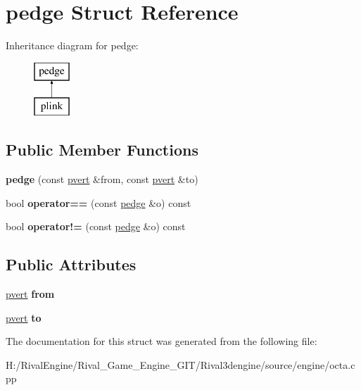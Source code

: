 \hypertarget{structpedge}{}\section{pedge Struct Reference}
\label{structpedge}
Inheritance diagram for pedge\+:\begin{figure}[H]
\begin{center}
\leavevmode
\includegraphics[height=2.000000cm]{structpedge}
\end{center}
\end{figure}
\subsection*{Public Member Functions}
\begin{DoxyCompactItemize}
\item 
\mbox{\label{structpedge_a10900ddf052ef9427bc41ba5072f2335}} 
{\bfseries pedge} (const \hyperlink{structpvert}{pvert} \&from, const \hyperlink{structpvert}{pvert} \&to)
\item 
\mbox{\label{structpedge_af578b46864dd5341a2b1b11c6eecc606}} 
bool {\bfseries operator==} (const \hyperlink{structpedge}{pedge} \&o) const
\item 
\mbox{\label{structpedge_aa636bef6c01668909081f60070dc592d}} 
bool {\bfseries operator!=} (const \hyperlink{structpedge}{pedge} \&o) const
\end{DoxyCompactItemize}
\subsection*{Public Attributes}
\begin{DoxyCompactItemize}
\item 
\mbox{\label{structpedge_a729917000df571a1b87b9390832badf0}} 
\hyperlink{structpvert}{pvert} {\bfseries from}
\item 
\mbox{\label{structpedge_a8666d3afac1d8bd48308c1d2cc5542c7}} 
\hyperlink{structpvert}{pvert} {\bfseries to}
\end{DoxyCompactItemize}


The documentation for this struct was generated from the following file\+:\begin{DoxyCompactItemize}
\item 
H\+:/\+Rival\+Engine/\+Rival\+\_\+\+Game\+\_\+\+Engine\+\_\+\+G\+I\+T/\+Rival3dengine/source/engine/octa.\+cpp\end{DoxyCompactItemize}
